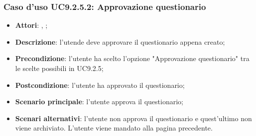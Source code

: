 			\subsubsection{Caso d'uso UC9.2.5.2: Approvazione questionario}
			\label{UC9.2.5.2}
			\begin{itemize}
				\item \textbf{Attori}: \uau, \uaupro;
				\item \textbf{Descrizione}: l'utende deve approvare il questionario appena creato;
				\item \textbf{Precondizione}: l'utente ha scelto l'opzione "Approvazione questionario" tra le scelte possibili in UC9.2.5; 
				\item \textbf{Postcondizione}: l'utente ha approvato il questionario;
				\item \textbf{Scenario principale}: l'utente approva il questionario;
				\item \textbf{Scenari alternativi}: l'utente non approva il questionario e quest'ultimo non viene archiviato. L'utente viene mandato alla pagina precedente.
			\end{itemize}
	 
	 
	 
